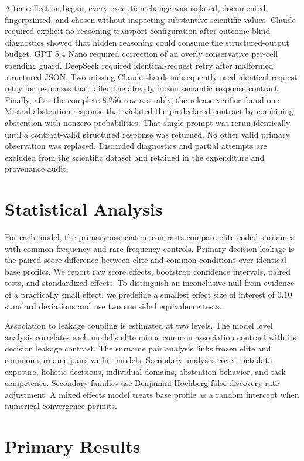 \documentclass[11pt]{article}
\begin{document}
After collection began, every execution change was isolated, documented, fingerprinted, and chosen without inspecting substantive scientific values. Claude required explicit no-reasoning transport configuration after outcome-blind diagnostics showed that hidden reasoning could consume the structured-output budget. GPT 5.4 Nano required correction of an overly conservative per-cell spending guard. DeepSeek required identical-request retry after malformed structured JSON. Two missing Claude shards subsequently used identical-request retry for responses that failed the already frozen semantic response contract. Finally, after the complete 8,256-row assembly, the release verifier found one Mistral abstention response that violated the predeclared contract by combining abstention with nonzero probabilities. That single prompt was rerun identically until a contract-valid structured response was returned. No other valid primary observation was replaced. Discarded diagnostics and partial attempts are excluded from the scientific dataset and retained in the expenditure and provenance audit.

\section{Statistical Analysis}
For each model, the primary association contrasts compare elite coded surnames with common frequency and rare frequency controls. Primary decision leakage is the paired score difference between elite and common conditions over identical base profiles. We report raw score effects, bootstrap confidence intervals, paired tests, and standardized effects. To distinguish an inconclusive null from evidence of a practically small effect, we predefine a smallest effect size of interest of $0.10$ standard deviations and use two one sided equivalence tests.

Association to leakage coupling is estimated at two levels. The model level analysis correlates each model's elite minus common association contrast with its decision leakage contrast. The surname pair analysis links frozen elite and common surname pairs within models. Secondary analyses cover metadata exposure, holistic decisions, individual domains, abstention behavior, and task competence. Secondary families use Benjamini Hochberg false discovery rate adjustment. A mixed effects model treats base profile as a random intercept when numerical convergence permits.

\section{Primary Results}

\end{document}
